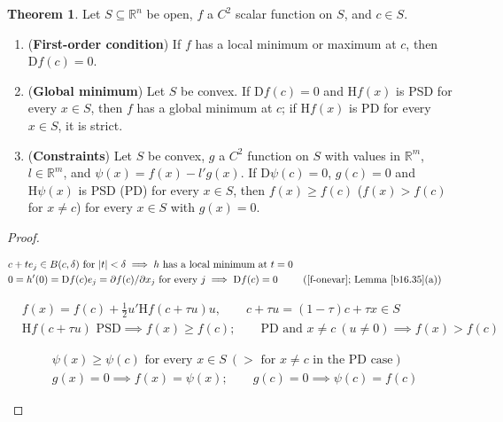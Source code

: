 \documentclass[12pt]{article}
\newcommand{\R}{\mathbb R}
\theoremstyle{definition}
\newtheorem{theorem}{Theorem}
\newcommand{\lec}[1]{Lecture~#1}
\newcommand{\boardtop}{\vspace*{-\abovedisplayskip}}
\begin{document}
\begin{theorem}\label{b16.36}
Let \(S\subseteq\R^n\) be open, \(f\) a \(C^2\) scalar function on \(S\), and \(c\in S\).
\begin{enumerate}
\item (\textbf{First-order condition}) If \(f\) has a local minimum or maximum at \(c\), then \(\mathrm Df(c)=0\).
\item (\textbf{Global minimum}) Let \(S\) be convex. If \(\mathrm Df(c)=0\) and \(\mathrm Hf(x)\) is PSD for every
\(x\in S\), then \(f\) has a global minimum at \(c\); if \(\mathrm Hf(x)\) is PD for every \(x\in S\), it is strict.
\item (\textbf{Constraints}) Let \(S\) be convex, \(g\) a \(C^2\) function on \(S\) with values in \(\R^m\),
\(l\in\R^m\), and \(\psi(x)=f(x)-l'g(x)\). If \(\mathrm D\psi(c)=0\), \(g(c)=0\) and \(\mathrm H\psi(x)\) is PSD (PD)
for every \(x\in S\), then \(f(x)\geqslant f(c)\) (\(f(x)>f(c)\) for \(x\ne c\)) for every \(x\in S\) with \(g(x)=0\).
\end{enumerate}
\end{theorem}
\begin{proof}
\begin{board}[(a) Local minimum (for a maximum apply this to \(-f\)): \(f(x)\geqslant f(c)\) on a ball
\(B(c,\delta)\subseteq S\) (\(\delta\) small; \(S\) open); \(h(t)=f(c+te_j)\) (Lemma~\ref{b16.35}, \(u=e_j\)); \(\mathrm Df(c)e_j\) is column \(j\) of \(\mathrm Df(c)\) (\lec{1}, Theorem~4(b)):]
\boardtop
\begin{align*}
&c+te_j\in B(c,\delta)\text{ for }\lvert t\rvert<\delta\implies h\text{ has a local minimum at }t=0\\
&0=h'(0)=\mathrm Df(c)e_j=\partial f(c)/\partial x_j\text{ for every }j\implies\mathrm Df(c)=0
&&\text{(\ref{f-onevar}; Lemma~\ref{b16.35}(a))}
\end{align*}
\end{board}
\begin{board}[(b) \(x\in S\), \(u=x-c\); Lemma~\ref{b16.35}(b) (\(S\) convex, \(c+u=x\in S\)) and \(\mathrm Df(c)=0\):]
\boardtop
\begin{align*}
&f(x)=f(c)+\tfrac12u'\mathrm Hf(c+\tau u)u,\qquad c+\tau u=(1-\tau)c+\tau x\in S\\
&\mathrm Hf(c+\tau u)\text{ PSD}\implies f(x)\geqslant f(c);\qquad\text{PD and }x\ne c\ (u\ne0)\implies f(x)>f(c)
\end{align*}
\end{board}
\begin{board}
\boardtop
\begin{align*}
&\psi(x)\geqslant\psi(c)\text{ for every }x\in S\ (>\text{ for }x\ne c\text{ in the PD case})\\
&g(x)=0\implies f(x)=\psi(x);\qquad g(c)=0\implies\psi(c)=f(c)
\end{align*}
\end{board}
\nopagebreak
\end{proof}
\end{document}
